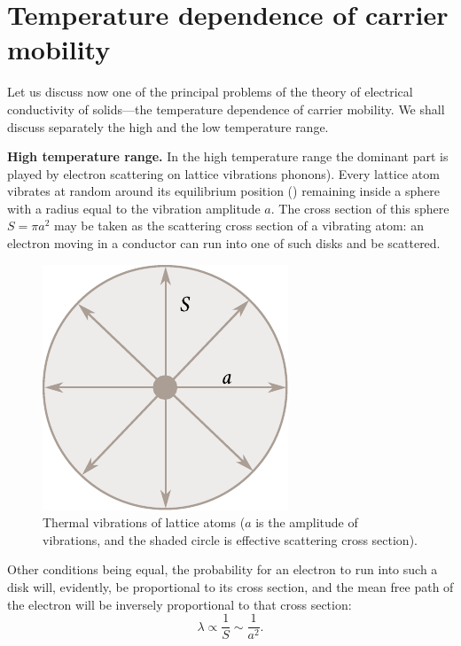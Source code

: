\section{Temperature dependence of carrier mobility}\label{sec:53}

Let us discuss now one of the principal problems of the theory of electrical conductivity of solids---the temperature dependence of carrier mobility. We shall discuss separately the high and the low temperature range.

\textbf{High temperature range.} In the high temperature range the dominant part is played by electron scattering on lattice vibrations phonons). Every lattice atom vibrates at random around its equilibrium position () remaining inside a sphere with a radius equal to the vibration amplitude $a$. The cross section of this sphere $S=\pi a^2$ may be taken as the scattering cross section of a vibrating atom: an electron moving in a conductor can run into one of such disks and be scattered.

\begin{figure}[t]
	\begin{center}
		\includegraphics[scale=1]{figures/ch_06/fig_6_5.pdf}
		\caption[]{Thermal vibrations of lattice atoms ($a$ is the amplitude of vibrations, and the shaded circle is effective scattering cross section).}
		\label{fig:6_5}
	\end{center}
	\vspace{-0.7cm}
\end{figure}

Other conditions being equal, the probability for an electron to run into such a disk will, evidently, be proportional to its cross section, and the mean free path of the electron will be inversely proportional to that cross section:
\begin{equation*}
    \lambda \propto \frac{1}{S} \sim \frac{1}{a^2}.
\end{equation*}

